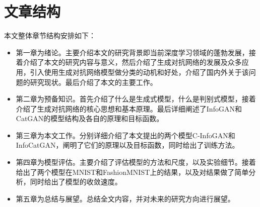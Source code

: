\section{文章结构}
本文整体章节结构安排如下：
\begin{itemize}
  \item 第一章为绪论。主要介绍本文的研究背景即当前深度学习领域的蓬勃发展，接着介绍了本文的研究内容与意义，然后介绍了生成对抗网络的发展及众多应用，引入使用生成对抗网络模型做分类的动机和好处，介绍了国内外关于该问题的研究现状。最后介绍了本文的主要工作。
  \item 第二章为预备知识。首先介绍了什么是生成式模型，什么是判别式模型，接着介绍了生成对抗网络的核心思想和基本原理。最后详细阐述了InfoGAN和CatGAN的模型结构及各自的原理和目标函数。
  \item 第三章为本文工作。分别详细介绍了本文提出的两个模型C-InfoGAN和InfoCatGAN，阐明了它们的原理以及目标函数，同时给出了训练方法。
  \item 第四章为模型评估。主要介绍了评估模型的方法和尺度，以及实验细节。接着给出了两个模型在MNIST和FashionMNIST上的结果，以及对结果做了简单分析，同时给出了模型的收敛速度。
  \item 第五章为总结与展望。总结全文内容，并对未来的研究方向进行展望。
\end{itemize}
